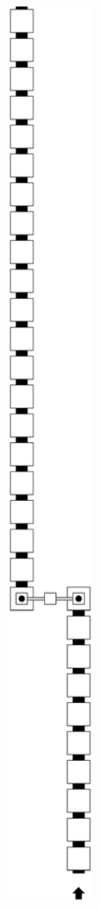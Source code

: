 \begin{itemize}
        \begin{figure}[H]\ContinuedFloat
            \centering
            \begin{subfigure}[t]{0.33\textwidth}
                \centering
                \includegraphics[width=0.33\textwidth]{warping_pre_warp_case2_digit1_msr}

\end{subfigure}
\end{figure}
\end{itemize}
